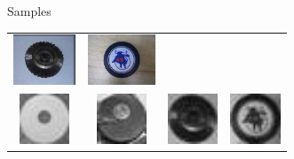 \documentclass{beamer}
\newcommand{\samplesheight}{1.5cm}
\begin{document}
\begin{frame}{Samples}
\begin{table}[H]
\begin{tabularx}{\textwidth}{@{}cccc@{}}
			\includegraphics[height=\samplesheight]{training_images/hard_negative/n03208556_13484} &
			\includegraphics[height=\samplesheight]{training_images/hard_negative/n04019541_26831} \\
			\includegraphics[height=\samplesheight]{training_images/hard_negative/n03208556_9694.thumbnail.jpg} &
			\includegraphics[height=\samplesheight]{training_images/hard_negative/n03208556_11973.thumbnail.jpg} &
			\includegraphics[height=\samplesheight]{training_images/hard_negative/n03208556_13484.thumbnail.jpg} &
			\includegraphics[height=\samplesheight]{training_images/hard_negative/n04019541_26831.thumbnail.jpg}
		\end{tabularx}
	\end{table}
\end{frame}
\end{document}
